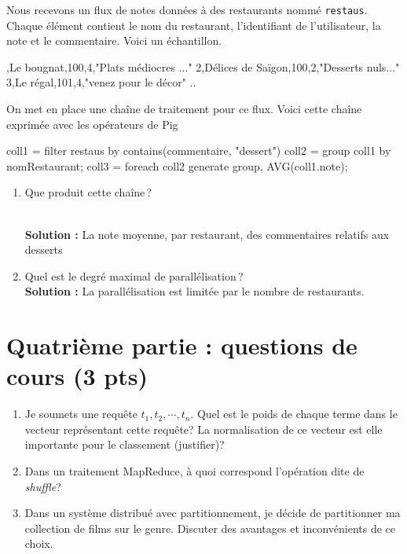 \documentclass[11pt,a4paper]{article}
\newenvironment{smallverbatim}%
{\endgraf\small\verbatim}{\endverbatim}
\newenvironment{solution}[0]{
~\\ \color{red} \textbf{Solution : }\color{black}}{%
}
\begin{document}
Nous recevons un flux de notes données à des restaurants nommé \texttt{restaus}. Chaque
élément contient le nom du restaurant, l'identifiant
de l'utilisateur, la note et le commentaire. Voici un échantillon.

\begin{smallverbatim}
1,Le bougnat,100,4,"Plats médiocres ..."
2,Délices de Saïgon,100,2,"Desserts nuls..."
3,Le régal,101,4,"venez pour le décor"
..
\end{smallverbatim}

On met en place une chaîne de traitement pour ce flux. Voici cette chaîne exprimée avec les opérateurs de Pig 

\begin{smallverbatim}
coll1 = filter restaus by contains(commentaire, "dessert")
coll2 = group coll1 by nomRestaurant;
coll3  = foreach coll2 generate group, AVG(coll1.note);
\end{smallverbatim} 

\begin{enumerate}
 \item Que produit cette chaîne\,?
 

\begin{solution}
La note moyenne, par restaurant, des commentaires relatifs aux desserts
\end{solution}
 
 \item Quel est le degré maximal de parallélisation\,?
\begin{solution}
La parallélisation est limitée par le nombre de restaurants.
\end{solution}

\end{enumerate}

\section*{Quatrième partie : questions de cours (3 pts)}

\begin{enumerate}
\item Je soumets une requête $t_1, t_2, \cdots, t_n$. 
    Quel est le poids de chaque terme dans le vecteur représentant cette requête? 
    La normalisation de ce vecteur est elle importante pour le classement (justifier)?
  
    \item Dans un traitement MapReduce, à quoi correspond l'opération dite de \textit{shuffle}?
    
    \item Dans un système distribué avec partitionnement, je
    décide de partitionner ma collection de films sur le genre. Discuter des avantages et inconvénients de ce choix.   
\end{enumerate}
\end{document}
